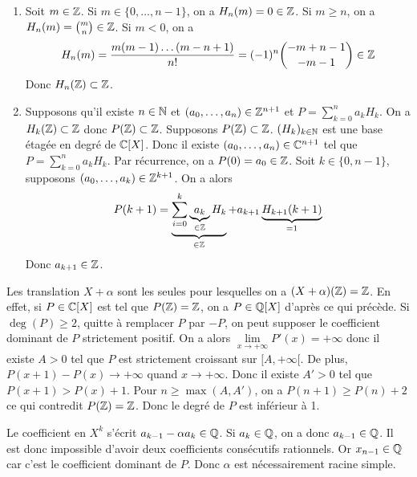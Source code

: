 \begin{solution}
	\phantom{}
	\begin{enumerate}
		\item Soit $m\in\mathbb{Z}$. Si $m\in\{0,\dots,n-1\}$, on a $H_{n}(m)=0\in\mathbb{Z}$.
		Si $m\geqslant n$, on a $H_{n}(m)=\binom{m}{n}\in\mathbb{Z}$. Si $m<0$, on a 
		$$H_{n}(m)=\frac{m(m-1)\dots(m-n+1)}{n!}=(-1)^{n}\binom{-m+n-1}{-m-1}\in\mathbb{Z}$$
		Donc $H_{n}(\mathbb{Z})\subset\mathbb{Z}$.

		\item Supposons qu'il existe $n\in\mathbb{N}$ et $(a_{0},\dots,a_{n})\in\mathbb{Z}^{n+1}$ et $P=\sum_{k=0}^{n}a_{k}H_{k}$. On a $H_{k}(\mathbb{Z})\subset\mathbb{Z}$ donc $P(\mathbb{Z})\subset\mathbb{Z}$.
		Supposons $P(\mathbb{Z})\subset\mathbb{Z}$. $(H_{k})_{k\in\mathbb{N}}$ est une base étagée en degré de $\mathbb{C}[X]$. Donc il existe $(a_{0},\dots,a_{n})\in\mathbb{C}^{n+1}$ tel que $P=\sum_{k=0}^{n}a_{k}H_{k}$. Par récurrence, on a $P(0)=a_{0}\in\mathbb{Z}$. Soit $k\in\{0,n-1\}$, supposons $(a_{0},\dots,a_{k})\in\mathbb{Z}^{k+1}$. On a alors 
		$$P(k+1)=\underbrace{\sum_{i=0}^{k}\underbrace{a_{k}}_{\in\mathbb{Z}}H_{k}}_{\in\mathbb{Z}}+a_{k+1}\underbrace{H_{k+1}(k+1)}_{=1}$$
		Donc $a_{k+1}\in\mathbb{Z}$.
	\end{enumerate}
\end{solution}

\begin{remark}
	Les translation $X+\alpha$ sont les seules pour lesquelles on a $(X+\alpha)(\mathbb{Z})=\mathbb{Z}$. En effet, si $P\in\mathbb{C}[X]$ est tel que $P(\mathbb{Z})=\mathbb{Z}$, on a $P\in\mathbb{Q}[X]$ d'après ce qui précède. Si $\deg(P)\geqslant2$, quitte à remplacer $P$ par $-P$, on peut supposer le coefficient dominant de $P$ strictement positif. On a alors $\lim\limits_{x\to+\infty}P'(x)=+\infty$ donc il existe $A>0$ tel que $P$ est strictement croissant sur $[A,+\infty[$. De plus, $P(x+1)-P(x)\to+\infty$ quand $x\to+\infty$. Donc il existe $A'>0$ tel que $P(x+1)>P(x)+1$. Pour $n\geqslant\max(A,A')$, on a $P(n+1)\geqslant P(n)+2$ ce qui contredit $P(\mathbb{Z})=\mathbb{Z}$. Donc le degré de $P$ est inférieur à 1.
\end{remark}

\begin{solution}
	Le coefficient en $X^{k}$ s'écrit $a_{k-1}-\alpha a_{k}\in\mathbb{Q}$. Si $a_{k}\in\mathbb{Q}$, on a donc $a_{k-1}\in\mathbb{Q}$. Il est donc impossible d'avoir deux coefficients consécutifs rationnels. Or $x_{n-1}\in\mathbb{Q}$ car c'est le coefficient dominant de $P$. Donc $\alpha$ est nécessairement racine simple.
\end{solution}

